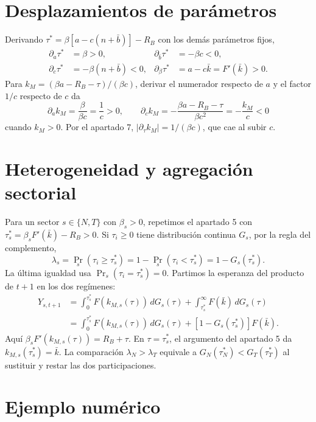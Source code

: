 \documentclass[11pt]{article}
\newcommand{\Rb}{R_B}
\newcommand{\km}{k_M}
\begin{document}
\section{Desplazamientos de parámetros}

Derivando $\tau^*=\beta[a-c(n+\bar b)]-\Rb$ con los demás parámetros fijos,
\begin{align*}
\partial_a\tau^*&=\beta>0, &
\partial_{\bar b}\tau^*&=-\beta c<0,\\
\partial_c\tau^*&=-\beta(n+\bar b)<0, &
\partial_\beta\tau^*&=a-c\bar k=F'(\bar k)>0.
\end{align*}
Para $\km=(\beta a-\Rb-\tau)/(\beta c)$, derivar el numerador respecto
de $a$ y el factor $1/c$ respecto de $c$ da
\[
\partial_a \km=\frac{\beta}{\beta c}=\frac1c>0,\qquad
\partial_c\km=-\frac{\beta a-\Rb-\tau}{\beta c^2}
=-\frac{\km}{c}<0
\]
cuando $\km>0$. Por el apartado 7,
$|\partial_\tau\km|=1/(\beta c)$, que cae al subir $c$.

\section{Heterogeneidad y agregación sectorial}

Para un sector $s\in\{N,T\}$ con $\beta_s>0$, repetimos el apartado 5
con $\tau_s^*=\beta_sF'(\bar k)-\Rb>0$. Si $\tau_i\geq0$ tiene
distribución continua $G_s$, por la regla del complemento,
\[
\lambda_s=\Pr_s(\tau_i\geq\tau_s^*)
=1-\Pr_s(\tau_i<\tau_s^*)=1-G_s(\tau_s^*).
\]
La última igualdad usa $\Pr_s(\tau_i=\tau_s^*)=0$.
Partimos la esperanza del producto de $t+1$ en los dos regímenes:
\begin{align*}
Y_{s,t+1}
&=\int_0^{\tau_s^*}F(k_{M,s}(\tau))\,dG_s(\tau)
 +\int_{\tau_s^*}^{\infty}F(\bar k)\,dG_s(\tau)\\
&=\int_0^{\tau_s^*}F(k_{M,s}(\tau))\,dG_s(\tau)
 +[1-G_s(\tau_s^*)]F(\bar k).
\end{align*}
Aquí $\beta_sF'(k_{M,s}(\tau))=\Rb+\tau$. En $\tau=\tau_s^*$, el
argumento del apartado 5 da $k_{M,s}(\tau_s^*)=\bar k$. La comparación
$\lambda_N>\lambda_T$ equivale a $G_N(\tau_N^*)<G_T(\tau_T^*)$ al sustituir
y restar las dos participaciones.

\section{Ejemplo numérico}
\end{document}
